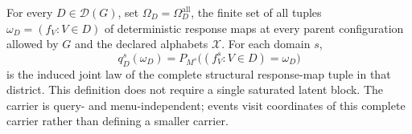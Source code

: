 For every \(D\in\mathcal D(G)\), set \(\Omega_D=\Omega_D^{\mathrm{all}}\), the finite set of all tuples \(\omega_D=(f_V:V\in D)\) of deterministic response maps at every parent configuration allowed by \(G\) and the declared alphabets \(\mathcal X\).  For each domain \(s\),
\[
q_D^s(\omega_D)=P_{M^s}\bigl((f_V^s:V\in D)=\omega_D\bigr)
\]
is the induced joint law of the complete structural response-map tuple in that district.  This definition does not require a single saturated latent block.  The carrier is query- and menu-independent; events visit coordinates of this complete carrier rather than defining a smaller carrier.